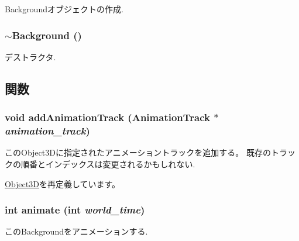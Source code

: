 Backgroundオブジェクトの作成. \hypertarget{classm3g_1_1Background_b793cb50870532320856acdd2caf84c3}{
\subsubsection[{$\sim$Background}]{\setlength{\rightskip}{0pt plus 5cm}$\sim${\bf Background} ()}}
\label{classm3g_1_1Background_b793cb50870532320856acdd2caf84c3}


デストラクタ. 

\subsection{関数}
\hypertarget{classm3g_1_1Background_415c0b110f95410ded9b85e5d99a496b}{
\subsubsection[{addAnimationTrack}]{\setlength{\rightskip}{0pt plus 5cm}void addAnimationTrack ({\bf AnimationTrack} $\ast$ {\em animation\_\-track})}}
\label{classm3g_1_1Background_415c0b110f95410ded9b85e5d99a496b}


このObject3Dに指定されたアニメーショントラックを追加する。 既存のトラックの順番とインデックスは変更されるかもしれない. 

\hyperlink{classm3g_1_1Object3D_415c0b110f95410ded9b85e5d99a496b}{Object3D}を再定義しています。\hypertarget{classm3g_1_1Background_8aad1ceab4c2a03609c8a42324ce484d}{
\subsubsection[{animate}]{\setlength{\rightskip}{0pt plus 5cm}int animate (int {\em world\_\-time})}}
\label{classm3g_1_1Background_8aad1ceab4c2a03609c8a42324ce484d}


このBackgroundをアニメーションする. 

